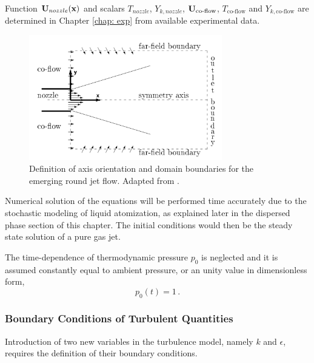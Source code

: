 Function $\mathbf{U}_{nozzle}(\mathbf{x})$ and scalars $T_{nozzle}$, $Y_{k,nozzle}$, $\mathbf{U}_{\text{co-flow}}$, $T_{\text{co-flow}}$ and $Y_{k,\text{co-flow}}$ are determined in Chapter \ref{chap: exp} from available experimental data.

\begin{figure}
\begin{center}
\includegraphics[width=0.75\textwidth]{./figuras/chap2/jet.png}
\end{center}
\caption{Definition of axis orientation and domain boundaries for the emerging round jet flow. Adapted from \cite{luppes}.}
\label{fig: jet_bc}
\end{figure}

Numerical solution of the equations will be performed time accurately due to the stochastic modeling of liquid atomization, as explained later in the dispersed phase section of this chapter. The initial conditions would then be the steady state solution of a pure gas jet. 

The time-dependence of thermodynamic pressure $p_0$ is neglected and it is assumed constantly equal to ambient pressure, or an unity value in dimensionless form,
\begin{equation}
 p_0 (t) = 1 \, .
\end{equation}


\subsubsection{Boundary Conditions of Turbulent Quantities}

Introduction of two new variables in the turbulence model, namely $k$ and $\epsilon$, requires the definition of their boundary conditions.

